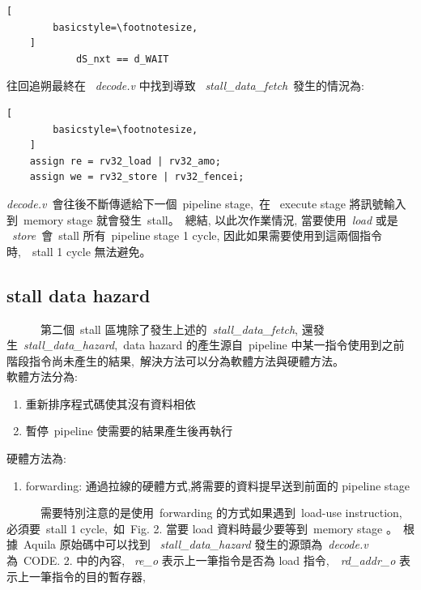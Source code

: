 \documentclass{article}
\begin{document}
\begin{CJK*}{UTF8}{bsmi}
\begin{multicols}{2}
\begin{center}
    \begin{lstlisting}[
        basicstyle=\footnotesize, 
    ]
            dS_nxt == d_WAIT
    \end{lstlisting}
\end{center}

\begin{flushleft}
往回追朔最終在 \ \textit{decode.v} 中找到導致 \ \textit{stall\_data\_fetch}\
發生的情況為:
\end{flushleft}

\begin{center}
    \begin{lstlisting}[
        basicstyle=\footnotesize, 
    ]
    assign re = rv32_load | rv32_amo; 
    assign we = rv32_store | rv32_fencei;
    \end{lstlisting}
\end{center}
\textit{decode.v}\ 會往後不斷傳遞給下一個\ pipeline stage,\
在 \ execute stage 將訊號輸入到\ memory stage 就會發生\ stall。\
總結, 以此次作業情況, 當要使用\ \textit{load} 或是 \ \textit{store}\ 
會\ stall 所有\ pipeline stage 1 cycle, 因此如果需要使用到這兩個指令時,\
\ stall 1 cycle 無法避免。

\begin{center}
    \subsection*{stall data hazard}
\end{center}

\begin{flushleft}
    \ \ \ \ \ \ 第二個\ stall 區塊除了發生上述的\ \textit{stall\_data\_fetch},
    還發生\ \textit{stall\_data\_hazard},\ data hazard 的產生源自\ pipeline 中某一指令使用到之前階段指令尚未產生的結果,\
    解決方法可以分為軟體方法與硬體方法。\\
    軟體方法分為:\
    \begin{enumerate}
        \item 重新排序程式碼使其沒有資料相依
        \item 暫停\ pipeline 使需要的結果產生後再執行
    \end{enumerate}
    硬體方法為:
    \begin{enumerate}
        \item forwarding: 通過拉線的硬體方式,將需要的資料提早送到前面的 pipeline stage
    \end{enumerate}
    \ \ \ \ \ \ 需要特別注意的是使用\ forwarding 的方式如果遇到\ load-use instruction, 必須要\ stall 1 cycle,\
    如\ Fig. 2. 當要 load 資料時最少要等到\ memory stage 。\
    根據\ Aquila 原始碼中可以找到 \ \textit{stall\_data\_hazard} 發生的源頭為\
    \textit{decode.v}\, 為\ CODE. 2. 中的內容, \ \textit{re\_o} 表示上一筆指令是否為 load 指令,\
    \ \textit{rd\_addr\_o} 表示上一筆指令的目的暫存器, \


\end{flushleft}
\end{multicols}
\end{CJK*}
\end{document}
